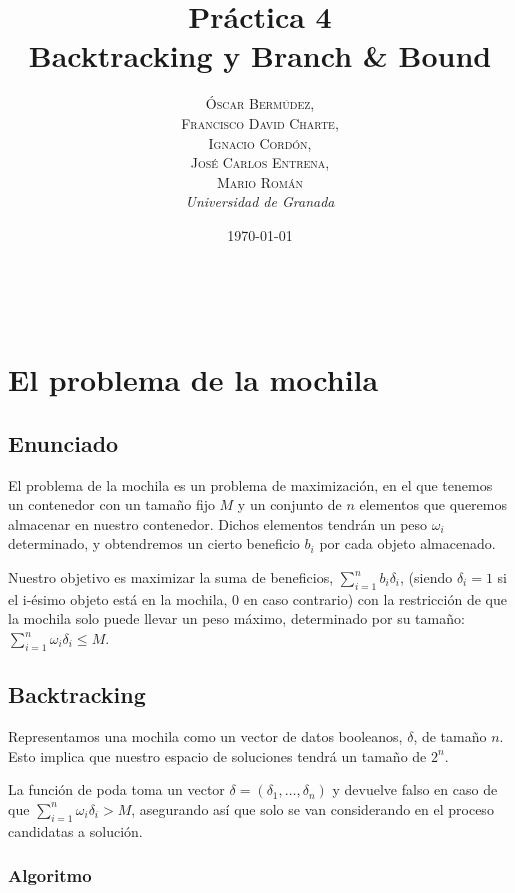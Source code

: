 \documentclass[a4paper, 11pt]{article} %
\title{\textbf{Práctica 4}\\ %
Backtracking y Branch \& Bound} %
\author{\textsc{Óscar Bermúdez,\\Francisco David Charte,\\Ignacio Cordón,\\José Carlos Entrena,\\Mario Román} %
\\{\textit{Universidad de Granada}}} %
\date{\today} %
\makeatletter
\renewcommand{\maketitle}{ %
\begin{flushright} %
{\LARGE\@title} %

\vspace{50pt} %

{\large\@author} %
\\\@date %

\vspace{40pt} %
\end{flushright}
}
\makeatother
\begin{document}
\maketitle %

\renewcommand{\abstractname}{Resumen} %
\begin{abstract}
\end{abstract}
{\parskip=2pt
\tableofcontents
}
\pagebreak


\section{El problema de la mochila}

\subsection{Enunciado}
El problema de la mochila es un problema de maximización, en el que tenemos un contenedor con un tamaño 
fijo $M$ y un conjunto de $n$ elementos que queremos almacenar en nuestro contenedor. Dichos elementos tendrán un peso $\omega_i$
determinado, y obtendremos un cierto beneficio $b_i$ por cada objeto almacenado.

Nuestro objetivo es maximizar la suma de beneficios, $\sum_{i=1}^{n} b_i\delta_i$, (siendo $\delta_i = 1$ si el i-ésimo objeto está en la mochila, 0 en caso contrario) con la restricción de que la mochila solo puede llevar un peso máximo, determinado por su tamaño: $\sum_{i=1}^{n} \omega_i\delta_i \leq M$.

  
    \subsection{Backtracking}
Representamos una mochila como un vector de datos booleanos, $\delta$, de tamaño $n$. Esto implica que nuestro espacio de soluciones tendrá un tamaño de $2^n$.

La función de poda toma un vector $\delta = (\delta_1, \dots, \delta_n)$ y devuelve falso en caso de que $\sum_{i=1}^{n} \omega_i\delta_i > M$, asegurando así que solo se van considerando en el proceso candidatas a solución.


	\subsubsection{Algoritmo}

\end{document}
